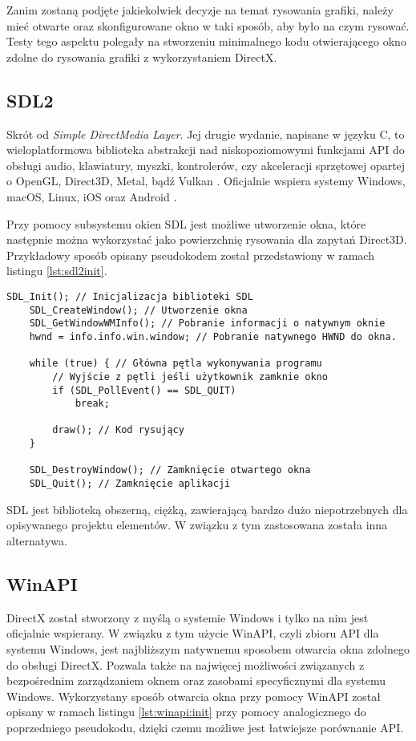 Zanim zostaną podjęte jakiekolwiek decyzje na temat rysowania grafiki,
należy mieć otwarte oraz skonfigurowane okno w taki sposób, aby było na
czym rysować. Testy tego aspektu polegały na stworzeniu minimalnego kodu otwierającego
okno zdolne do rysowania grafiki z wykorzystaniem DirectX.

\subsection{SDL2}

Skrót od \emph{Simple DirectMedia Layer}. Jej drugie wydanie, napisane w
języku C, to wieloplatformowa biblioteka abstrakcji nad niskopoziomowymi
funkcjami API do obsługi audio, klawiatury, myszki, kontrolerów, czy
akceleracji sprzętowej opartej o OpenGL, Direct3D, Metal, bądź Vulkan
\cite{sdl:wiki:2024}. Oficjalnie wspiera systemy Windows, macOS, Linux, iOS oraz
Android \cite{sdl:wiki:2024}. 

Przy pomocy subsystemu okien SDL jest możliwe utworzenie okna, które
następnie można wykorzystać jako powierzchnię rysowania dla zapytań
Direct3D. Przykładowy sposób opisany pseudokodem został przedstawiony w ramach listingu \ref{lst:sdl2init}.

\begin{lstlisting}[caption={Pseudokod inicjalizacji okna SDL2 (oryginalna treść)}, label={lst:sdl2init}]
	SDL_Init(); // Inicjalizacja biblioteki SDL
	SDL_CreateWindow(); // Utworzenie okna
	SDL_GetWindowWMInfo(); // Pobranie informacji o natywnym oknie
	hwnd = info.info.win.window; // Pobranie natywnego HWND do okna.
	
	while (true) { // Główna pętla wykonywania programu
		// Wyjście z pętli jeśli użytkownik zamknie okno
		if (SDL_PollEvent() == SDL_QUIT)
			break;
	
		draw(); // Kod rysujący
	}
		
	SDL_DestroyWindow(); // Zamknięcie otwartego okna
	SDL_Quit(); // Zamknięcie aplikacji
\end{lstlisting}

SDL jest biblioteką obszerną, ciężką, zawierającą bardzo dużo
niepotrzebnych dla opisywanego projektu elementów. W związku z tym
zastosowana została inna alternatywa.

\subsection{WinAPI}

DirectX został stworzony z myślą o systemie Windows i tylko na nim jest
oficjalnie wspierany. W związku z tym użycie WinAPI, czyli zbioru API
dla systemu Windows, jest najbliższym natywnemu sposobem otwarcia okna
zdolnego do obsługi DirectX. Pozwala także na najwięcej możliwości
związanych z bezpośrednim zarządzaniem oknem oraz zasobami specyficznymi
dla systemu Windows. Wykorzystany sposób otwarcia okna przy pomocy WinAPI został opisany
w ramach listingu \ref{lst:winapi:init} przy pomocy analogicznego do poprzedniego pseudokodu, dzięki czemu możliwe jest łatwiejsze porównanie API.

